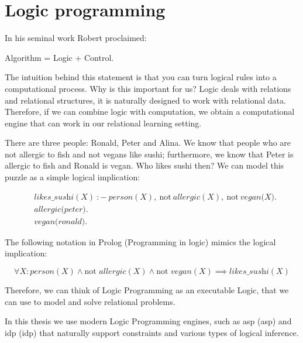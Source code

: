 \section{Logic programming}
In his seminal work Robert \textcite{kowalski} proclaimed:
\begin{center}
  Algorithm = Logic + Control.
\end{center}

The intuition behind this statement is that
you can turn logical rules into a computational process. 
Why is this important for us? Logic deals with
relations and relational structures, it is naturally designed to
work with relational data. Therefore, if we can combine logic
with computation, we obtain a computational engine that can work in
our relational learning setting.

\begin{example}
There are three people: Ronald, Peter and
Alina. We know that people who are not allergic to fish and not vegans like sushi; 
furthermore, we know that Peter is allergic to fish and Ronald is
    vegan. 
Who likes sushi then? We can model this puzzle as a
simple logical implication:

\begin{equation*}
    \begin{aligned}
& \textit{likes\_sushi}(X)~{:}{-}~\textit{person}(X),~\text{not}~
        \textit{allergic}(X), ~\text{not}~\textit{vegan(X)}. \\
&       \textit{allergic(peter)}. \\
&       \textit{vegan(ronald)}.
    \end{aligned}
\end{equation*}

The following notation in Prolog (Programming in logic)
\parencite{prolog_original} mimics the logical implication:

\begin{equation}\label{eq:sushi}
  \forall X: \textit{person}(X) \wedge \text{not }
    \textit{allergic}(X) \wedge \text{not } \textit{vegan}(X)
  \implies \textit{likes\_sushi}(X)
\end{equation}
\end{example}
Therefore, we can think of Logic Programming as an executable Logic, that
we can use to model and solve relational problems.

In this thesis we use modern Logic Programming engines, such
as \acrlong{asp} (\acrshort{asp}) \parencite{ASPbook,whatisasp} and
\acrlong{idp} (\acrshort{idp})
\parencite{idp} %
that naturally support constraints and various types of logical
inference.

